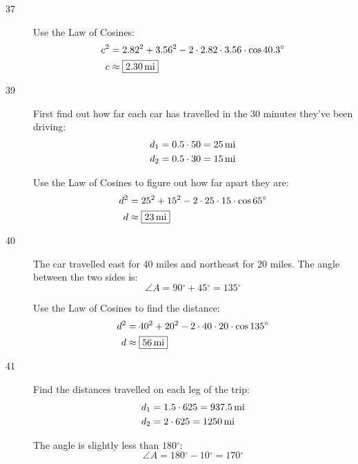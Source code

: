 \documentclass{exam}
\newcommand{\dg}{\ensuremath{^\circ}}
\begin{document}
\begin{description}
      \item[37]
        Use the Law of Cosines:
        \begin{align*}
          c^2 & = 2.82^2 + 3.56^2 - 2 \cdot 2.82 \cdot 3.56 \cdot \cos 40.3 \dg \\
          c   & \approx \boxed{ \unit[2.30]{mi} } \\
        \end{align*}

      \item[39]
        First find out how far each car has travelled in the 30 minutes they've been driving:
        \begin{align*}
          d_1 &= 0.5 \cdot 50 = \unit[25]{mi} \\
          d_2 &= 0.5 \cdot 30 = \unit[15]{mi} \\
        \end{align*}

        Use the Law of Cosines to figure out how far apart they are:
        \begin{align*}
          d^2 & = 25^2 + 15^2 - 2 \cdot 25 \cdot 15 \cdot \cos 65 \dg \\
          d   & \approx \boxed{ \unit[23]{mi} } \\
        \end{align*}

      \item[40]
        The car travelled east for 40 miles and northeast for 20 miles.  The angle between the two sides is:
        \[
          \angle A = 90 \dg + 45 \dg = 135 \dg
        \]

        Use the Law of Cosines to find the distance:
        \begin{align*}
          d^2 & = 40^2 + 20^2 - 2 \cdot 40 \cdot 20 \cdot \cos 135 \dg \\
          d   & \approx \boxed{ \unit[56]{mi} } \\
        \end{align*}

      \item[41]
        Find the distances travelled on each leg of the trip:
        \begin{align*}
          d_1 &= 1.5 \cdot 625 = \unit[937.5]{mi} \\
          d_2 &= 2 \cdot 625 = \unit[1250]{mi} \\
        \end{align*}

        The angle is slightly less than $180 \dg$:
        \[
          \angle A = 180 \dg - 10 \dg = 170 \dg
        \]


\end{description}
\end{document}
